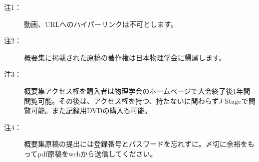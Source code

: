 \documentclass[12pt,a4paper,upLaTeX]{jsarticle}
\begin{document}
\begin{description}
\item[注1：] 動画、URLへのハイパーリンクは不可とします。
\item[注2：] 概要集に掲載された原稿の著作権は日本物理学会に帰属します。
\item[注3：] 概要集アクセス権を購入者は物理学会のホームページで大会終了後1年間閲覧可能。その後は、アクセス権を持つ、持たないに関わらずJ-Stageで閲覧可能。また記録用DVDの購入も可能。
\item[注4：] 概要集原稿の提出には登録番号とパスワードを忘れずに。〆切に余裕をもってpdf原稿をwebから送信してください。
\end{description}
\end{document}
